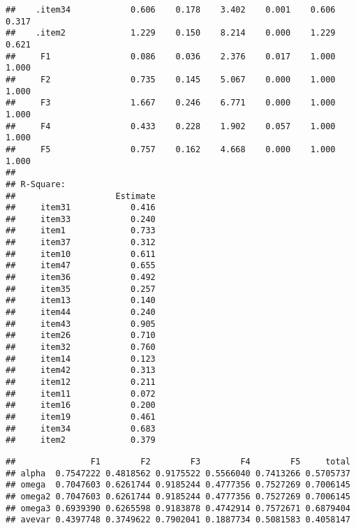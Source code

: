 \documentclass[
  english,
  man]{apa6}
\begin{document}
\begin{verbatim}
##    .item34            0.606    0.178    3.402    0.001    0.606    0.317
##    .item2             1.229    0.150    8.214    0.000    1.229    0.621
##     F1                0.086    0.036    2.376    0.017    1.000    1.000
##     F2                0.735    0.145    5.067    0.000    1.000    1.000
##     F3                1.667    0.246    6.771    0.000    1.000    1.000
##     F4                0.433    0.228    1.902    0.057    1.000    1.000
##     F5                0.757    0.162    4.668    0.000    1.000    1.000
## 
## R-Square:
##                    Estimate
##     item31            0.416
##     item33            0.240
##     item1             0.733
##     item37            0.312
##     item10            0.611
##     item47            0.655
##     item36            0.492
##     item35            0.257
##     item13            0.140
##     item44            0.240
##     item43            0.905
##     item26            0.710
##     item32            0.760
##     item14            0.123
##     item42            0.313
##     item12            0.211
##     item11            0.072
##     item16            0.200
##     item19            0.461
##     item34            0.683
##     item2             0.379
\end{verbatim}

\begin{verbatim}
##               F1        F2        F3        F4        F5     total
## alpha  0.7547222 0.4818562 0.9175522 0.5566040 0.7413266 0.5705737
## omega  0.7047603 0.6261744 0.9185244 0.4777356 0.7527269 0.7006145
## omega2 0.7047603 0.6261744 0.9185244 0.4777356 0.7527269 0.7006145
## omega3 0.6939390 0.6265598 0.9183878 0.4742914 0.7572671 0.6879404
## avevar 0.4397748 0.3749622 0.7902041 0.1887734 0.5081583 0.4058147
\end{verbatim}
\end{document}
